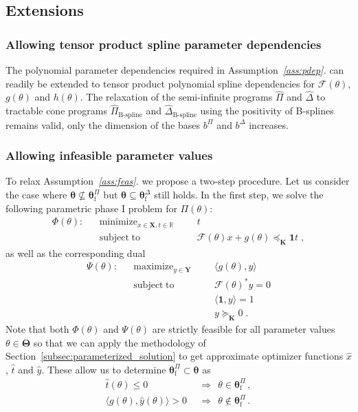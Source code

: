 \documentclass{article}
\DeclareMathOperator*{\minimize}{minimize}
\DeclareMathOperator*{\maximize}{maximize}
\DeclareMathOperator*{\subj}{subject\;to}
\newcommand{\R}{\mathbb{R}}         %
\newcommand{\adj}{\ast}                     %
\newcommand{\feas}{\mathrm{f}}              %
\newcommand{\ppar}{\theta}                          %
\newcommand{\Ppar}{{\bm{\theta}}}                   %
\newcommand{\PPar}{{\bm{\Theta}}}                   %
\newcommand{\X}{\mathbf{X}}                         %
\newcommand{\Y}{\mathbf{Y}}                         %
\newcommand{\K}{\mathbf{K}}                         %
\newcommand{\calF}{\mathcal{F}}                     %
\newcommand{\Pfeas}{\Ppar^\Pi_\feas}                %
\newcommand{\Dfeas}{\Ppar^\Delta_\feas}             %
\newcommand{\bPi}{b^\Pi}                %
\newcommand{\bDelta}{b^\Delta}          %
\begin{document}

\subsection{Extensions}\label{subsec:extensions}

\subsubsection{Allowing tensor product spline parameter dependencies}

The polynomial parameter dependencies required in  Assumption~{\it{}\ref{ass:pdep}.} can readily be extended to tensor product polynomial spline dependencies for $\calF(\ppar)$, $g(\ppar)$ and $h(\ppar)$. The relaxation of the semi-infinite programs $\hat{\Pi}$ and $\hat{\Delta}$ to tractable cone programs $\hat{\Pi}_{\text{B-spline}}$ and $\hat{\Delta}_{\text{B-spline}}$ using the positivity of B-splines remains valid, only the dimension of the bases $\bPi$ and $\bDelta$ increases.

\subsubsection{Allowing infeasible parameter values}%

To relax Assumption~{\it{}\ref{ass:feas}.} we propose a two-step procedure. Let us consider the case where $\Ppar\nsubseteq\Pfeas$ but $\Ppar\subseteq\Dfeas$ still holds. In the first step, we solve the following parametric phase I problem for $\Pi(\ppar)$:
\[ \begin{aligned}
\Phi(\ppar): && \minimize_{x\in\X, t\in\R} &&& t \\%
             && \subj                      &&& \calF(\ppar)x + g(\ppar)\preceq_\K  \mathbf{1} t \;,%
\end{aligned} \]
as well as the corresponding dual
\[ \begin{aligned}
\Psi(\ppar): && \maximize_{y\in\Y} &&& \langle g(\ppar), y \rangle \\%
             && \subj              &&& \calF(\ppar)^\adj y = 0 \\%
             &&                    &&& \langle \mathbf{1}, y \rangle = 1\\%
             &&                    &&& y \succeq_\K 0 \;.%
\end{aligned} \]
Note that both $\Phi(\ppar)$ and $\Psi(\ppar)$ are strictly feasible for all parameter values $\ppar\in\PPar$ so that we can apply the methodology of Section~\ref{subsec:parameterized_solution} to get approximate optimizer functions $\hat{x}$, $\hat{t}$ and $\hat{y}$. These allow us to determine $\Pfeas\subset\Ppar$ as
\[ \begin{aligned}
\hat{t}(\ppar) \leq 0 &~~\Rightarrow~~ \ppar\in\Pfeas \,,\\
\langle g(\ppar), \hat{y}(\ppar) \rangle > 0 &~~\Rightarrow~~ \ppar\notin\Pfeas\,.%
\end{aligned}\]
\end{document}
